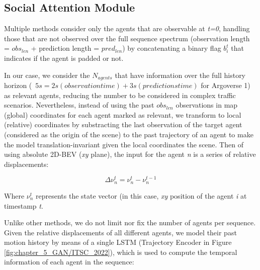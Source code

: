 \subsection{Social Attention Module}
\label{subsec:5_attention_module}

Multiple methods \cite{liang2020learning, schmidt2022crat} consider only the agents that are observable at \textit{t=0}, handling those that are not observed over the full sequence spectrum (observation length = \textit{$obs_{len}$} + prediction length = \textit{$pred_{len}$}) by concatenating a binary flag $b_i^t$ that indicates if the agent is padded or not. 

In our case, we consider the $N_{agents}$ that have information over the full history horizon (\eg \ $5s = 2s (observation time) + 3s (predictions time)$ for Argoverse 1) as relevant agents, reducing the number to be considered in complex traffic scenarios. Nevertheless, instead of using the past $obs_{len}$ observations in map (global) coordinates for each agent marked as relevant, we transform to local (relative) coordinates by substracting the last observation of the target agent (considered as the origin of the scene) to the past trajectory of an agent to make the model translation-invariant given the local coordinates the scene. Then of using absolute 2D-\ac{BEV} (\textit{xy} plane), the input for the agent \textit{n} is a series of relative displacements:

\begin{equation}
	\label{eq:5_relative_displacements}
	\Delta \nu^{t}_n = \nu^{t}_n - \nu^{t-1}_n
\end{equation}

Where $\nu^{t}_n$ represents the state vector (in this case, \textit{xy} position of the agent \textit{i} at timestamp \textit{t}. %

Unlike other methods, we do not limit nor fix the number of agents per sequence. Given the relative displacements of all different agents, we model their past motion history by means of a single \ac{LSTM} (Trajectory Encoder in Figure \ref{fig:chapter_5_GAN/ITSC_2022}), which is used to compute the temporal information of each agent in the sequence:

